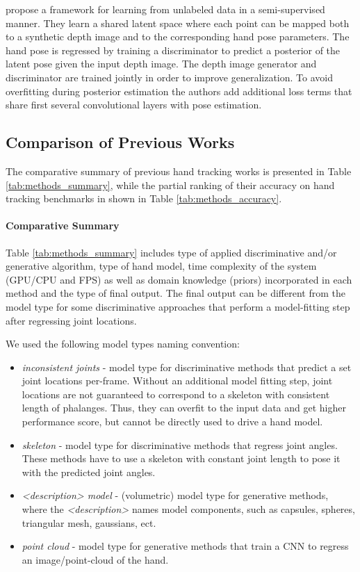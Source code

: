 \hspace{-0.4em}
\textbf{\cite{wan2017crossing}} 
propose a framework for learning from unlabeled data in a semi-supervised manner. They learn a shared latent space where each point can be mapped both to a synthetic depth image and to the corresponding hand pose parameters. The hand pose is regressed by training a discriminator to predict a posterior of the latent pose given the input depth image. The depth image generator and discriminator are trained jointly in order to improve generalization. To avoid overfitting during posterior estimation the authors add  additional loss terms that share first several convolutional layers with pose estimation.

\subsection{Comparison of Previous Works}
The comparative summary of previous hand tracking works is presented in Table \ref{tab:methods_summary}, while the partial ranking of their accuracy on hand tracking benchmarks in shown in Table \ref{tab:methods_accuracy}. 

\paragraph{Comparative Summary} Table \ref{tab:methods_summary} includes type of applied discriminative and/or generative algorithm, type of hand model, time complexity of the system (GPU/CPU and FPS) as well as domain knowledge (priors) incorporated in each method and the type of final output. The final output can be different from the model type for some discriminative approaches that perform a model-fitting step after regressing joint locations. 

We used the following model types naming convention: 
\vspace{-1em}
\begin{itemize}
\item \textit{inconsistent joints} - model type for discriminative methods that predict a set joint locations per-frame. Without an additional model fitting step, joint locations are not guaranteed to correspond to a skeleton with consistent length of phalanges. Thus, they can overfit to the input data and get higher performance score, but cannot be directly used to drive a hand model.
\item \textit{skeleton} - model type for discriminative methods that regress joint angles. These methods have to use a skeleton with constant joint length to pose it with the predicted joint angles.
\item \textit{<description> model} - (volumetric) model type for generative methods, where the \textit{<description>} names model components, such as capsules, spheres, triangular mesh, gaussians, ect.
\item \textit{point cloud} - model type for generative methods that train a CNN to regress an image/point-cloud of the hand.
\end{itemize}

